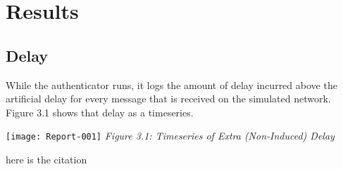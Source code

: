 \documentclass[12pt]{article}
\begin{document}
\section{Results}

\subsection{Delay}

While the authenticator runs, it logs the amount of delay incurred above the artificial delay for every message that is received on the simulated network. Figure 3.1 shows that delay as a timeseries.

\begin{center}
\texttt{[image: Report-001]}
\textit{Figure 3.1: Timeseries of Extra (Non-Induced) Delay}
\end{center}

\begin{thebibliography}{9} 

 here is the citation


\end{thebibliography} 
\end{document}
